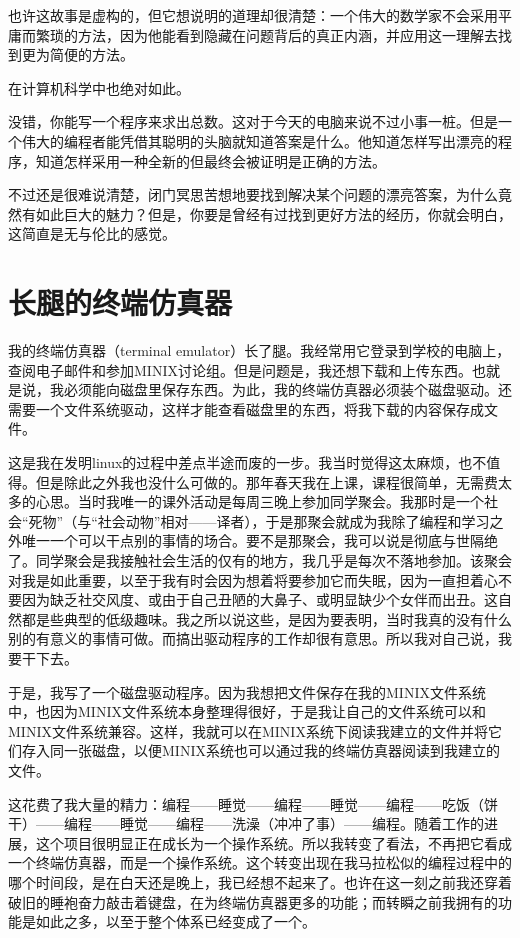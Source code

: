 也许这故事是虚构的，但它想说明的道理却很清楚：一个伟大的数学家不会采用平庸而繁琐的方法，因为他能看到隐藏在问题背后的真正内涵，并应用这一理解去找到更为简便的方法。

在计算机科学中也绝对如此。

没错，你能写一个程序来求出总数。这对于今天的电脑来说不过小事一桩。但是一个伟大的编程者能凭借其聪明的头脑就知道答案是什么。他知道怎样写出漂亮的程序，知道怎样采用一种全新的但最终会被证明是正确的方法。

 

不过还是很难说清楚，闭门冥思苦想地要找到解决某个问题的漂亮答案，为什么竟然有如此巨大的魅力？但是，你要是曾经有过找到更好方法的经历，你就会明白，这简直是无与伦比的感觉。

 
\section{长腿的终端仿真器}

我的终端仿真器（terminal emulator）长了腿。我经常用它登录到学校的电脑上，查阅电子邮件和参加MINIX讨论组。但是问题是，我还想下载和上传东西。也就是说，我必须能向磁盘里保存东西。为此，我的终端仿真器必须装个磁盘驱动。还需要一个文件系统驱动，这样才能查看磁盘里的东西，将我下载的内容保存成文件。

这是我在发明linux的过程中差点半途而废的一步。我当时觉得这太麻烦，也不值得。但是除此之外我也没什么可做的。那年春天我在上课，课程很简单，无需费太多的心思。当时我唯一的课外活动是每周三晚上参加同学聚会。我那时是一个社会“死物”（与“社会动物”相对——译者），于是那聚会就成为我除了编程和学习之外唯一一个可以干点别的事情的场合。要不是那聚会，我可以说是彻底与世隔绝了。同学聚会是我接触社会生活的仅有的地方，我几乎是每次不落地参加。该聚会对我是如此重要，以至于我有时会因为想着将要参加它而失眠，因为一直担着心不要因为缺乏社交风度、或由于自己丑陋的大鼻子、或明显缺少个女伴而出丑。这自然都是些典型的低级趣味。我之所以说这些，是因为要表明，当时我真的没有什么别的有意义的事情可做。而搞出驱动程序的工作却很有意思。所以我对自己说，我要干下去。

于是，我写了一个磁盘驱动程序。因为我想把文件保存在我的MINIX文件系统中，也因为MINIX文件系统本身整理得很好，于是我让自己的文件系统可以和MINIX文件系统兼容。这样，我就可以在MINIX系统下阅读我建立的文件并将它们存入同一张磁盘，以便MINIX系统也可以通过我的终端仿真器阅读到我建立的文件。

这花费了我大量的精力：编程——睡觉——编程——睡觉——编程——吃饭（饼干）——编程——睡觉——编程——洗澡（冲冲了事）——编程。随着工作的进展，这个项目很明显正在成长为一个操作系统。所以我转变了看法，不再把它看成一个终端仿真器，而是一个操作系统。这个转变出现在我马拉松似的编程过程中的哪个时间段，是在白天还是晚上，我已经想不起来了。也许在这一刻之前我还穿着破旧的睡袍奋力敲击着键盘，在为终端仿真器更多的功能；而转瞬之前我拥有的功能是如此之多，以至于整个体系已经变成了一个。

